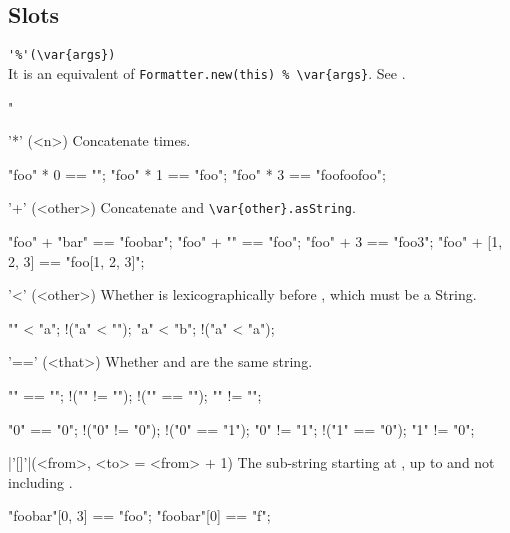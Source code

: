\subsection{Slots}
\begin{urbiscriptapi}
\item \lstinline|'%'(\var{args})|\\
  It is an equivalent of \lstinline|Formatter.new(this) % \var{args}|.
  See .
\begin{urbiassert}
"%
\end{urbiassert}


\item['*'](<n>)%
  Concatenate \this {} times.
\begin{urbiassert}
"foo" * 0 == "";
"foo" * 1 == "foo";
"foo" * 3 == "foofoofoo";
\end{urbiassert}


\item['+'](<other>)%
  Concatenate \this and \lstinline|\var{other}.asString|.
\begin{urbiassert}
"foo" + "bar" == "foobar";
"foo" + "" == "foo";
"foo" + 3 == "foo3";
"foo" + [1, 2, 3] == "foo[1, 2, 3]";
\end{urbiassert}


\item['<'](<other>)%
  Whether \this is lexicographically before ,
  which must be a String.
\begin{urbiassert}
"" < "a";
!("a" < "");
"a" < "b";
!("a" < "a");
\end{urbiassert}


\item['=='](<that>)%
  Whether \this and  are the same string.
\begin{urbiassert}
  "" == "";        !("" != "");
!("" == "\0");       "" != "\0";

  "0" == "0";      !("0" != "0");
!("0" == "1");       "0" != "1";
!("1" == "0");       "1" != "0";
\end{urbiassert}


\item|'[]'|(<from>, <to> = <from> + 1)%
  The sub-string starting at , up to and not including .
\begin{urbiassert}
"foobar"[0, 3] == "foo";
"foobar"[0] == "f";
\end{urbiassert}


\end{urbiscriptapi}
